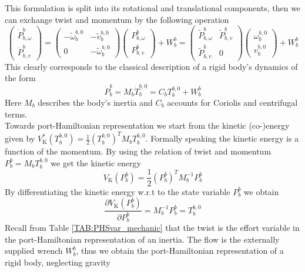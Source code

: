 \documentclass[a4paper,twoside, openright,12pt]{report}
\newcommand{\g}[1]{\text{#1}}
\begin{document}
{\begin{eqnarray}
\begin{aligned}
\end{aligned} 
\end{eqnarray}
This formulation is split into its rotational and translational components, then we can exchange twist and momentum by the following operation
\begin{equation}\label{EQ:centripetaldetail}
\begin{pmatrix}
\dot{P}_{b,\omega}^b \\ \dot{P}_{b,v}^b \end{pmatrix} = \begin{pmatrix}
-\tilde{\omega}_b^{b,0} & -\tilde{v}_b^{b,0} \\ 0 & -\tilde{\omega}_b^{b,0}\end{pmatrix} \begin{pmatrix}
P_{b,\omega}^b \\ P_{b,v}^b 
\end{pmatrix} + W_b^b = \begin{pmatrix}
\tilde{P}_{b,\omega}^b & \tilde{P}_{b,v}^b \\ \tilde{P}_{b,v}^b & 0
\end{pmatrix} \begin{pmatrix}
\omega_b^{b,0} \\ v_b^{b,0}
\end{pmatrix} +W_b^b
\end{equation}
This clearly corresponds to the classical description of a rigid body's dynamics of the form
\begin{equation}
	\dot{P}_b^b = M_b \dot{T}_b^{b,0}  = C_b T_b^{b,0} + W_{b}^b
\end{equation}
Here $M_b$ describes the body's inertia and $C_b$ accounts for Coriolis and centrifugal terms.\\
Towards port-Hamiltonian representation we start from the kinetic (co-)energy given by $V_\g{K}^*(T_b^{b,0}) =\frac{1}{2}(T_b^{b,0})^T M_b T_b^{b,0}$. Formally speaking the kinetic energy is a function of the momentum. By using the relation of twist and momentum $P_b^b = M_b T_b^{b,0}$ we get the kinetic energy
\begin{equation}
V_\g{K}(P_b^b) = \frac{1}{2}(P_b^b)^T M_b^{-1} P_b^b
\end{equation}
By differentiating the kinetic energy w.r.t to the state variable $P_b^b$ we obtain 
\begin{equation}
\frac{\partial V_\g{K}(P_b^b)}{\partial P_b^b} = M_b^{-1} P_b^b = T_b^{b,0}
\end{equation}
Recall from Table \ref{TAB:PHSvar_mechanic} that the twist is the effort variable in the port-Hamiltonian representation of an inertia. The flow is the externally supplied wrench $W_b^b$, thus we obtain the port-Hamiltonian representation of a rigid body, neglecting gravity
}
\end{document}
